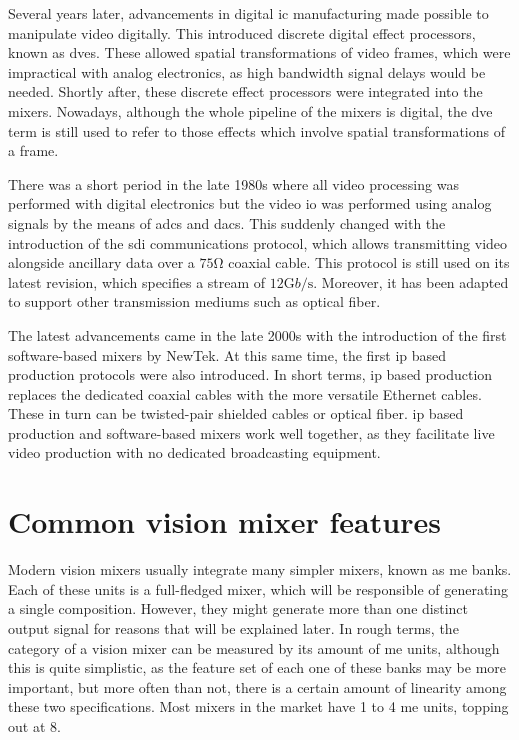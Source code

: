 \documentclass[../main.tex]{subfiles}
\begin{document}
Several years later, advancements in digital \gls{ic} manufacturing made possible to manipulate video digitally\cite{kitplus2015}. This introduced discrete digital effect processors, known as \glspl{dve}. These allowed spatial transformations of video frames, which were impractical with analog electronics, as high bandwidth signal delays would be needed. Shortly after, these discrete effect processors were integrated into the mixers. Nowadays, although the whole pipeline of the mixers is digital, the \gls{dve} term is still used to refer to those effects which involve spatial transformations of a frame\cite{OwensJim2020Tp}\cite{UtterbackAndrew2015STPa}.\newline

There was a short period in the late 1980s where all video processing was performed with digital electronics but the video \gls{io} was performed using analog signals by the means of \glspl{adc} and \glspl{dac}. This suddenly changed with the introduction of the \gls{sdi} communications protocol, which allows transmitting video alongside ancillary data over a $75 \si{\ohm}$ coaxial cable\cite{OrtizRodriguez2018}. This protocol is still used on its latest revision, which specifies a stream of $12 \si{\giga b \per\second}$. Moreover, it has been adapted to support other transmission mediums such as optical fiber.\newline

The latest advancements came in the late 2000s with the introduction of the first software-based mixers by NewTek. At this same time, the first \gls{ip} based production protocols were also introduced. In short terms, \gls{ip} based production replaces the dedicated coaxial cables with the more versatile Ethernet cables. These in turn can be twisted-pair shielded cables or optical fiber. \Gls{ip} based production and software-based mixers work well together, as they facilitate live video production with no dedicated broadcasting equipment.\newline


\section{Common vision mixer features}
Modern vision mixers usually integrate many simpler mixers, known as \gls{me} banks\cite{}. Each of these units is a full-fledged mixer, which will be responsible of generating a single composition. However, they might generate more than one distinct output signal for reasons that will be explained later. In rough terms, the category of a vision mixer can be measured by its amount of \gls{me} units, although this is quite simplistic, as the feature set of each one of these banks may be more important, but more often than not, there is a certain amount of linearity among these two specifications. Most mixers in the market have 1 to 4 \gls{me} units, topping out at 8.\newline
\end{document}
